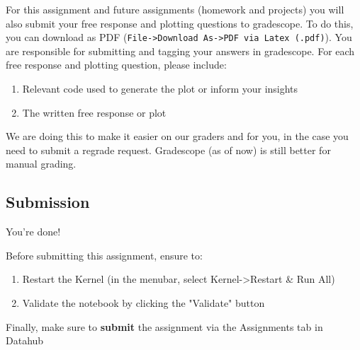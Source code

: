 \documentclass[11pt]{article}
\providecommand{\tightlist}{%
      \setlength{\itemsep}{0pt}\setlength{\parskip}{0pt}}
\begin{document}
For this assignment and future assignments (homework and projects) you
will also submit your free response and plotting questions to
gradescope. To do this, you can download as PDF
(\texttt{File-\textgreater{}Download\ As-\textgreater{}PDF\ via\ Latex\ (.pdf)}).
You are responsible for submitting and tagging your answers in
gradescope. For each free response and plotting question, please
include:

\begin{enumerate}
\def\labelenumi{\arabic{enumi}.}
\tightlist
\item
  Relevant code used to generate the plot or inform your insights
\item
  The written free response or plot
\end{enumerate}

We are doing this to make it easier on our graders and for you, in the
case you need to submit a regrade request. Gradescope (as of now) is
still better for manual grading.

    \subsection{Submission}\label{submission}

You're done!

Before submitting this assignment, ensure to:

\begin{enumerate}
\def\labelenumi{\arabic{enumi}.}
\tightlist
\item
  Restart the Kernel (in the menubar, select
  Kernel-\textgreater{}Restart \& Run All)
\item
  Validate the notebook by clicking the "Validate" button
\end{enumerate}

Finally, make sure to \textbf{submit} the assignment via the Assignments
tab in Datahub


    
    
    
    
\end{document}
